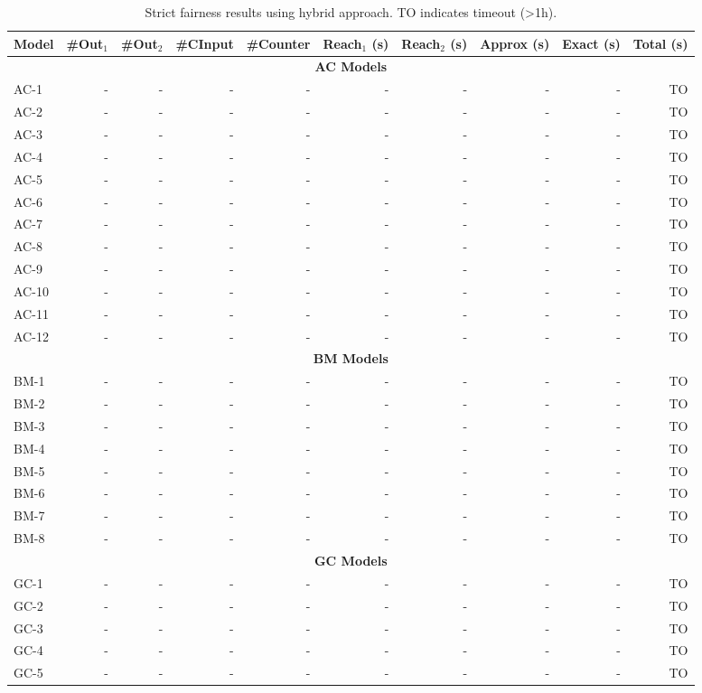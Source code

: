 \begin{table}[htbp]
\centering
\begin{tabular}{|l|r|r|r|r|r|r|r|r|r|}
\hline
Model & \#Out$_1$ & \#Out$_2$ & \#CInput & \#Counter & Reach$_1$ (s) & Reach$_2$ (s) & Approx (s) & Exact (s) & Total (s) \\
\hline
\multicolumn{10}{|c|}{\textbf{AC Models}} \\
\hline
AC-1 & - & - & - & - & - & - & - & - & TO \\
AC-2 & - & - & - & - & - & - & - & - & TO \\
AC-3 & - & - & - & - & - & - & - & - & TO \\
AC-4 & - & - & - & - & - & - & - & - & TO \\
AC-5 & - & - & - & - & - & - & - & - & TO \\
AC-6 & - & - & - & - & - & - & - & - & TO \\
AC-7 & - & - & - & - & - & - & - & - & TO \\
AC-8 & - & - & - & - & - & - & - & - & TO \\
AC-9 & - & - & - & - & - & - & - & - & TO \\
AC-10 & - & - & - & - & - & - & - & - & TO \\
AC-11 & - & - & - & - & - & - & - & - & TO \\
AC-12 & - & - & - & - & - & - & - & - & TO \\
\hline
\multicolumn{10}{|c|}{\textbf{BM Models}} \\
\hline
BM-1 & - & - & - & - & - & - & - & - & TO \\
BM-2 & - & - & - & - & - & - & - & - & TO \\
BM-3 & - & - & - & - & - & - & - & - & TO \\
BM-4 & - & - & - & - & - & - & - & - & TO \\
BM-5 & - & - & - & - & - & - & - & - & TO \\
BM-6 & - & - & - & - & - & - & - & - & TO \\
BM-7 & - & - & - & - & - & - & - & - & TO \\
BM-8 & - & - & - & - & - & - & - & - & TO \\
\hline
\multicolumn{10}{|c|}{\textbf{GC Models}} \\
\hline
GC-1 & - & - & - & - & - & - & - & - & TO \\
GC-2 & - & - & - & - & - & - & - & - & TO \\
GC-3 & - & - & - & - & - & - & - & - & TO \\
GC-4 & - & - & - & - & - & - & - & - & TO \\
GC-5 & - & - & - & - & - & - & - & - & TO \\
\hline
\end{tabular}
\caption{Strict fairness results using hybrid approach. TO indicates timeout (>1h).}
\label{tab:strict_fair_hybrid}
\end{table}